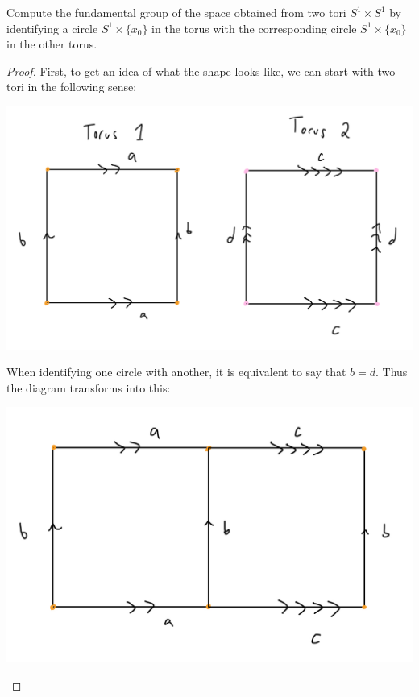 \documentclass[12pt]{article}
\newenvironment{statement}[2][Statement]{\begin{trivlist}
\item[\hskip \labelsep {\bfseries #1}\hskip \labelsep {\bfseries #2.}]}{\end{trivlist}}
\begin{document}
\begin{statement}[Problem]{4}
  Compute the fundamental group of the space obtained from two tori $S^1 \times S^1$ by identifying a circle $S^1 \times \{x_0\}$ 
  in the torus with the corresponding circle $S^1 \times \{x_0\}$ in the other torus.
\end{statement}
\begin{proof}
  First, to get an idea of what the shape looks like, we can start with two tori in the following sense:
  \par \begin{center} \includegraphics[scale=.2]{4-1.jpg} \end{center}
  \par When identifying one circle with another, it is equivalent to say that $b=d$. Thus the diagram transforms into this:
  \par \begin{center} \includegraphics[scale=.2]{4-2.jpg} \end{center}

\end{proof}
\end{document}
